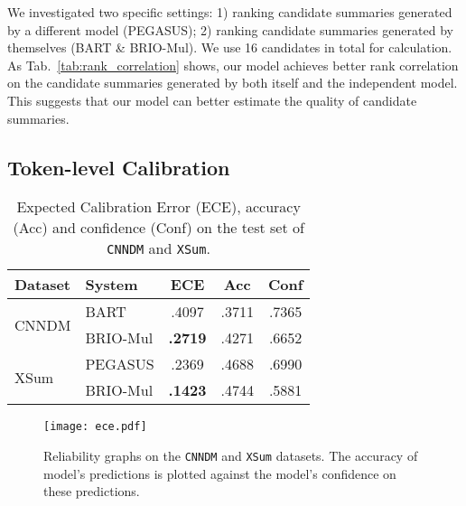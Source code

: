 \documentclass[11pt]{article}
\newcommand{\model}{BRIO\xspace}
\begin{document}
We investigated two specific settings: 1) ranking candidate summaries generated by a different model (PEGASUS); 2) ranking candidate summaries generated by themselves (BART \& \model-Mul).
We use 16 candidates in total for calculation. 
As Tab.~\ref{tab:rank_correlation} shows, our model achieves better rank correlation on the candidate summaries generated by both itself and the independent model.
This suggests that our model can better estimate the quality of candidate summaries. 




\subsection{Token-level Calibration}

\begin{table}[t]
\centering
\small
\begin{tabular}{llccc}
\toprule
\textbf{Dataset} & \textbf{System} & \textbf{ECE} & \textbf{Acc} & \textbf{Conf}\\
\midrule
 \multirow{2}{*}{CNNDM} & BART & .4097 & .3711 & .7365\\
  & \model-Mul & \textbf{.2719} & .4271 & .6652\\
\midrule
 \multirow{2}{*}{XSum} & PEGASUS & .2369 & .4688 & .6990\\
  & \model-Mul &  \textbf{.1423} & .4744  & .5881\\
\bottomrule
\end{tabular}
\caption{\label{tab:ece} Expected Calibration Error (ECE), accuracy (Acc) and confidence (Conf) on the test set of \texttt{CNNDM} and \texttt{XSum}.}
\end{table}

\begin{figure}[t]
    \centering
    \texttt{[image: ece.pdf]}
    \caption{Reliability graphs on the \texttt{CNNDM} and \texttt{XSum} datasets.
    The accuracy of model's predictions is plotted against the model's confidence on these predictions.}
    \label{fig:ece}
\end{figure}
\end{document}
